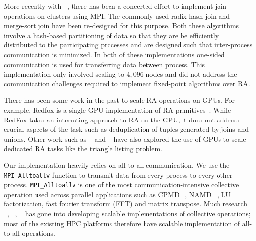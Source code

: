 More recently with ~\cite{Barthels:2017:DJA:3055540.3055545}, there has been a concerted effort to implement join operations on clusters using MPI. The commonly used radix-hash join and merge-sort join have been re-designed for this purpose. Both these algorithms involve a hash-based partitioning of data so that they are be efficiently distributed to the participating processes and are designed such that inter-process communication is minimized. In both of these implementations one-sided communication is used for transferring data between process. This implementation only involved scaling to $4,\!096$ nodes and did not address the communication challenges required to implement fixed-point algorithms over RA.
 
There has been some work in the past to scale RA operations on GPUs. For example,
Redfox is a single-GPU implementation of RA primitives~\cite{Wu:2014:RFE:2581122.2544166}. While RedFox takes an interesting approach to RA on the GPU, it does not address crucial aspects of the task such as deduplication of tuples generated by joins and unions. Other work such as ~\cite{Martinez-Angeles:2016:RLG:2932241.2932244} and ~\cite{Zinn:2016:GJA:2884045.2884054} have also explored the use of GPUs to scale dedicated RA tasks like the triangle listing problem.

Our implementation heavily relies on all-to-all communication. We use the \texttt{MPI\_Alltoallv} function to transmit data from every process to every other process.
\texttt{MPI\_Alltoallv} is one of the most communication-intensive collective operation used across parallel applications such as CPMD ~\cite{cpmd-web}, NAMD ~\cite{1592872}, LU factorization, fast fourier transform (FFT) and matrix transpose.
Much research ~\cite{4536141}, ~\cite{642949}, ~\cite{Thakur:2005:OCC:2747766.2747771} has gone into developing scalable implementations of collective operations; most of the existing HPC platforms therefore have scalable implementation of all-to-all operations. 




